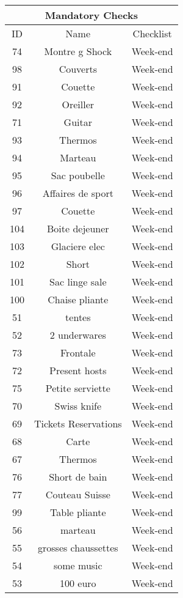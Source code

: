 \begin{longtable}{|c|c|c|}
\hline
\multicolumn{3}{|c|}{Mandatory Checks} \\
\hline
ID & Name & Checklist\\
\hline
74 & Montre g Shock & Week-end\\
\hline
98 & Couverts & Week-end\\
\hline
91 & Couette & Week-end\\
\hline
92 & Oreiller & Week-end\\
\hline
71 & Guitar & Week-end\\
\hline
93 & Thermos & Week-end\\
\hline
94 & Marteau & Week-end\\
\hline
95 & Sac poubelle & Week-end\\
\hline
96 & Affaires de sport & Week-end\\
\hline
97 & Couette & Week-end\\
\hline
104 & Boite dejeuner & Week-end\\
\hline
103 & Glaciere elec & Week-end\\
\hline
102 & Short & Week-end\\
\hline
101 & Sac linge sale & Week-end\\
\hline
100 & Chaise pliante & Week-end\\
\hline
51 & tentes & Week-end\\
\hline
52 & 2 underwares & Week-end\\
\hline
73 & Frontale & Week-end\\
\hline
72 & Present hosts & Week-end\\
\hline
75 & Petite serviette & Week-end\\
\hline
70 & Swiss knife & Week-end\\
\hline
69 & Tickets Reservations & Week-end\\
\hline
68 & Carte & Week-end\\
\hline
67 & Thermos & Week-end\\
\hline
76 & Short de bain & Week-end\\
\hline
77 & Couteau Suisse & Week-end\\
\hline
99 & Table pliante & Week-end\\
\hline
56 & marteau & Week-end\\
\hline
55 & grosses chaussettes & Week-end\\
\hline
54 & some music & Week-end\\
\hline
53 & 100 euro & Week-end\\

\end{longtable}
